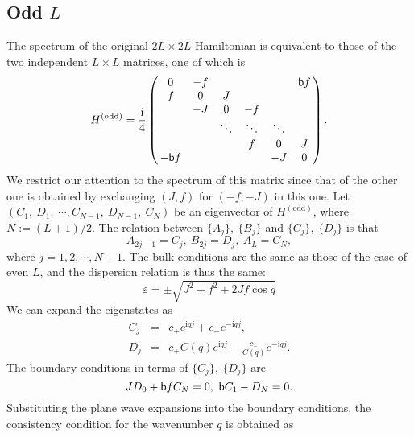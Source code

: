 \documentclass[aps, prb, showpacs, twocolumn, %
amssymb,superscriptaddress]{revtex4}
\newcommand{\ii}{\text{i}}
\begin{document}
\subsection{Odd $L$}
\label{sec:}

The spectrum of the original $2L \times 2L$ Hamiltonian is equivalent to those of the two independent $L \times L$ matrices, one of which is
\begin{equation}
H^{\left( \mathrm{odd} \right)} = \frac{\ii}{4} \left( \begin{array}{@{\,}cccccc@{\,}}
	0 & -f & & & & {\sf b} f \\
	f & 0 & J & & & \\
	& -J & 0 & -f & & \\
	& & \ddots & \ddots & \ddots & \\
	& & & f & 0 & J \\
	- {\sf b} f & & & & -J & 0 \\ \end{array} \right).
\end{equation}
We restrict our attention to the spectrum of this matrix since that of the other one is obtained by exchanging $(J,f)$ for $(-f,-J)$ in this one. Let $\left( C_{1},~D_{1},~\cdots, C_{N-1},~D_{N-1},~C_{N} \right)$ be an eigenvector of $H^{\left( \mathrm{odd} \right)}$, where $N := (L+1)/2$. The relation between $\{ A_{j} \},~\{ B_{j} \}$ and $\{ C_{j} \},~\{ D_{j} \}$ is that
\begin{equation}
A_{2j-1} = C_{j},~B_{2j} = D_{j},~A_{L} = C_{N},
\end{equation}
where $j=1,2, \cdots, N-1$. The bulk conditions are the same as those of the case of even $L$, and the dispersion relation is thus the same:
\begin{equation}
\varepsilon = \pm \sqrt{J^{2} + f^{2} + 2Jf \cos q}
\end{equation}
We can expand the eigenstates as
\begin{eqnarray}
C_{j} &=& c_{+} e^{\ii qj} + c_{-} e^{-\ii qj}, \nonumber \\
D_{j} &=& c_{+} C \left( q \right) e^{\ii qj} - \frac{c_{-}}{C \left( q \right)} e^{-\ii qj}.
\end{eqnarray}
The boundary conditions in terms of $\{ C_{j} \},~\{ D_{j} \}$ are
\begin{equation}
JD_{0} + {\sf b} f C_{N} = 0,~{\sf b} C_{1} - D_{N} = 0.
\end{equation}
Substituting the plane wave expansions into the boundary conditions, the consistency condition for the wavenumber $q$ is obtained as
\end{document}
